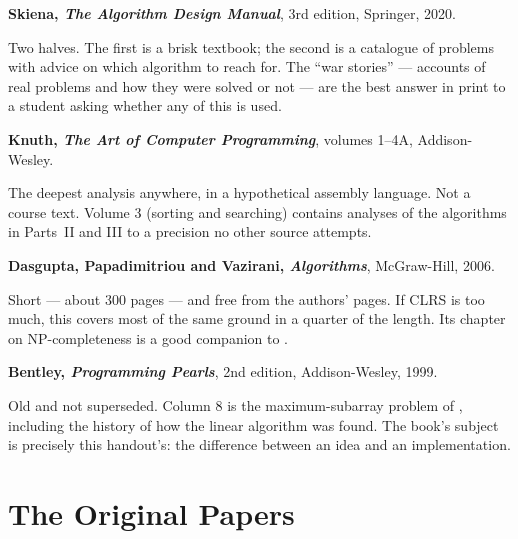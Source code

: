 \begin{conceptbox}
\textbf{Skiena, \emph{The Algorithm Design Manual}}, 3rd edition, Springer,
2020.

\smallskip
Two halves. The first is a brisk textbook; the second is a catalogue of
problems with advice on which algorithm to reach for. The ``war stories'' ---
accounts of real problems and how they were solved or not --- are the best
answer in print to a student asking whether any of this is used.

\medskip
\textbf{Knuth, \emph{The Art of Computer Programming}}, volumes 1--4A,
Addison-Wesley.

\smallskip
The deepest analysis anywhere, in a hypothetical assembly language. Not a
course text. Volume 3 (sorting and searching) contains analyses of the
algorithms in Parts~II and III to a precision no other source attempts.

\medskip
\textbf{Dasgupta, Papadimitriou and Vazirani, \emph{Algorithms}},
McGraw-Hill, 2006.

\smallskip
Short --- about 300 pages --- and free from the authors' pages. If CLRS is too
much, this covers most of the same ground in a quarter of the length. Its
chapter on NP-completeness is a good companion to .

\medskip
\textbf{Bentley, \emph{Programming Pearls}}, 2nd edition, Addison-Wesley,
1999.

\smallskip
Old and not superseded. Column 8 is the maximum-subarray problem of
, including the history of how the linear algorithm was
found. The book's subject is precisely this handout's: the difference between
an idea and an implementation.
\end{conceptbox}

\section{The Original Papers}

